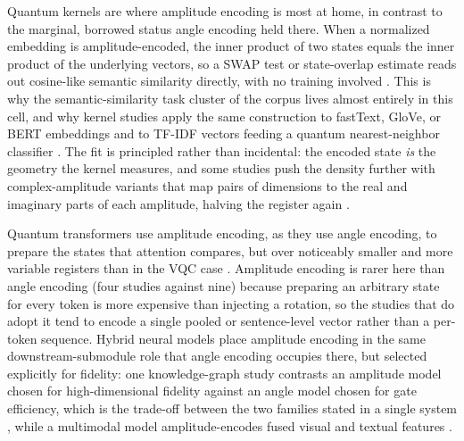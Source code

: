 \documentclass{ieeeaccess}
\begin{document}
Quantum kernels are where amplitude encoding is most at home, in contrast to the marginal, borrowed status angle encoding held there. When a normalized embedding is amplitude-encoded, the inner product of two states equals the inner product of the underlying vectors, so a SWAP test or state-overlap estimate reads out cosine-like semantic similarity directly, with no training involved \cite{cavar_old_2026,cavar_word_2025,cavar_semantic_2024}. This is why the semantic-similarity task cluster of the corpus lives almost entirely in this cell, and why kernel studies apply the same construction to fastText, GloVe, or BERT embeddings and to TF-IDF vectors feeding a quantum nearest-neighbor classifier \cite{alexander_quantum_2022,zeguendry_quantum_2024}. The fit is principled rather than incidental: the encoded state \emph{is} the geometry the kernel measures, and some studies push the density further with complex-amplitude variants that map pairs of dimensions to the real and imaginary parts of each amplitude, halving the register again \cite{cavar_old_2026}.

Quantum transformers use amplitude encoding, as they use angle encoding, to prepare the states that attention compares, but over noticeably smaller and more variable registers than in the VQC case \cite{zheng_design_2023,sharma_elevating_2025,aktar_hybrid_2026,karanath_q-optbert_2026}. Amplitude encoding is rarer here than angle encoding (four studies against nine) because preparing an arbitrary state for every token is more expensive than injecting a rotation, so the studies that do adopt it tend to encode a single pooled or sentence-level vector rather than a per-token sequence. Hybrid neural models place amplitude encoding in the same downstream-submodule role that angle encoding occupies there, but selected explicitly for fidelity: one knowledge-graph study contrasts an amplitude model chosen for high-dimensional fidelity against an angle model chosen for gate efficiency, which is the trade-off between the two families stated in a single system \cite{hendl_incorporating_2025}, while a multimodal model amplitude-encodes fused visual and textual features \cite{zheng_quantum_2025}.
\end{document}
